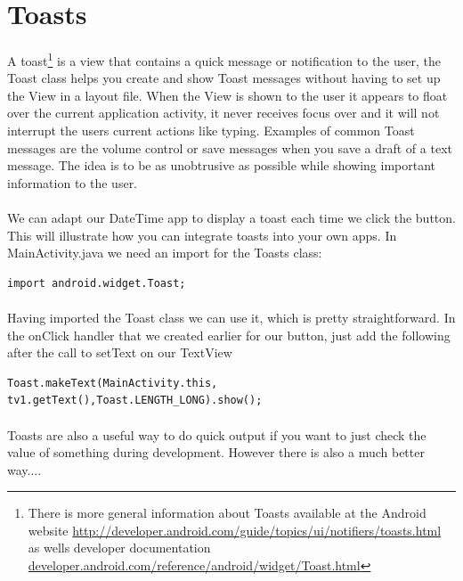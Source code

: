 \section{Toasts}
\paragraph{} A toast\footnote{There is more general information about Toasts available at the Android website \url{http://developer.android.com/guide/topics/ui/notifiers/toasts.html} as wells developer documentation \url{developer.android.com/reference/android/widget/Toast.html}} is a view that contains a quick message or notification to the user, the Toast class helps you create and show Toast messages without having to set up the View in a layout file. When the View is shown to the user it appears to float over the current application activity, it never receives focus over and it will not interrupt the users current actions like typing. Examples of common Toast messages are the volume control or save messages when you save a draft of a text message. The idea is to be as unobtrusive as possible while showing important information to the user.

\paragraph{} We can adapt our DateTime app to display a toast each time we click the button. This will illustrate how you can integrate toasts into your own apps. In MainActivity.java we need an import for the Toasts class:

\begin{lstlisting}
import android.widget.Toast;
\end{lstlisting}

\paragraph{} Having imported the Toast class we can use it, which is pretty straightforward. In the onClick handler that we created earlier for our button, just add the following after the call to setText on our TextView

\begin{lstlisting}
Toast.makeText(MainActivity.this, tv1.getText(),Toast.LENGTH_LONG).show();
\end{lstlisting}

\paragraph{} Toasts are also a useful way to do quick output if you want to just check the value of something during development. However there is also a much better way....

